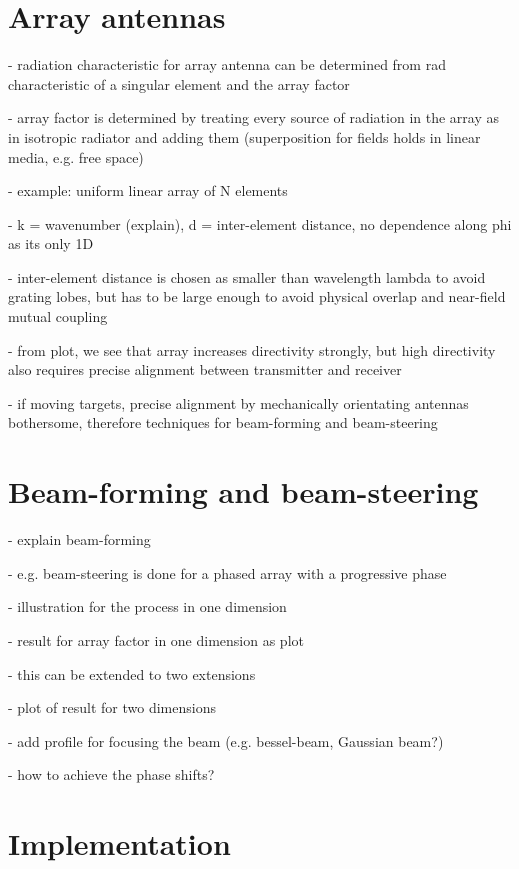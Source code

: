 \documentclass[]{report}
\begin{document}
\section{Array antennas}
- radiation characteristic for array antenna can be determined from rad characteristic of a singular element and the array factor

- array factor is determined by treating every source of radiation in the array as in isotropic radiator and adding them (superposition for fields holds in linear media, e.g. free space)

- example: uniform linear array of N elements

- k = wavenumber (explain), d = inter-element distance, no dependence along phi as its only 1D

- inter-element distance is chosen as smaller than wavelength lambda to avoid grating lobes, but has to be large enough to avoid physical overlap and near-field mutual coupling

- from plot, we see that array increases directivity strongly, but high directivity also requires precise alignment between transmitter and receiver

- if moving targets, precise alignment by mechanically orientating antennas bothersome, therefore techniques for beam-forming and beam-steering

\section{Beam-forming and beam-steering}

- explain beam-forming

- e.g. beam-steering is done for a phased array with a progressive phase

- illustration for the process in one dimension

- result for array factor in one dimension as plot

- this can be extended to two extensions

- plot of result for two dimensions

- add profile for focusing the beam (e.g. bessel-beam, Gaussian beam?)

- how to achieve the phase shifts?

\section{Implementation}
\end{document}
